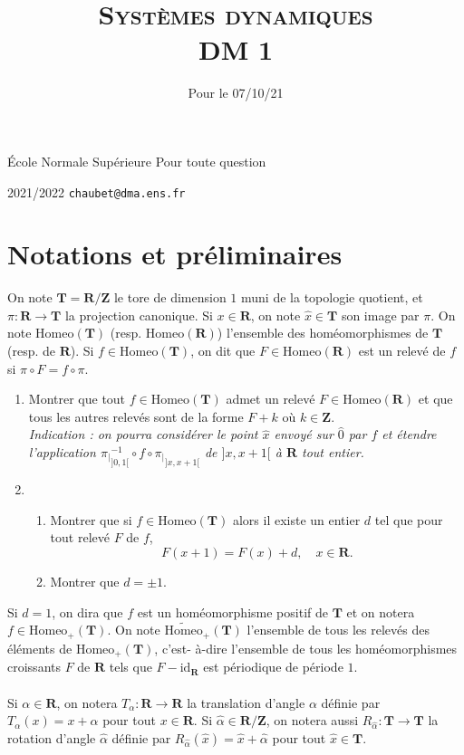 \documentclass[a4paper,12pt]{article}
\title{\textsc{Syst\`emes dynamiques} \\ DM 1}
\date{{Pour le 07/10/21}}
\author{}
\theoremstyle{plain}
\theoremstyle{definition}
\newcommand{\T}{\mathbf{T}}
\newcommand{\R}{\mathbf{R}}
\newcommand{\Z}{\mathbf{Z}}
\newcommand{\Homeo}{\mathrm{Homeo}}
\begin{document}
{\noindent \'Ecole Normale Sup\'erieure \hfill Pour toute question} 
\\
{2021/2022 \hfill \texttt{chaubet@dma.ens.fr}


{\let \newpage \relax \maketitle}
\maketitle

\section*{Notations et pr\'eliminaires}
On note $\T = \R / \Z$ le tore de dimension $1$ muni de la topologie quotient, et $\pi : \R \to \T$ la projection canonique. Si $x \in \R$, on note $\hat{x} \in \T$ son image par $\pi$. On note $\Homeo(\T)$ (resp. $\Homeo(\R)$) l'ensemble des hom\'eomorphismes de $\T$ (resp. de $\R$). Si $f \in \Homeo(\T)$, on dit que $F \in \Homeo(\R)$ est un relev\'e de $f$ si $ \pi \circ F = f \circ \pi.$ 
\\ 
\begin{enumerate}[label=\textbf{\arabic*.}]
\item Montrer que tout $f \in \Homeo(\T)$ admet un relev\'e $F \in \Homeo(\R)$ et que tous les autres relev\'es sont de la forme $F + k$ o\`u $k \in \Z$.\\
\textit{Indication : on pourra consid\'erer le point $\hat x$ envoy\'e sur $\hat{0}$ par $f$ et \'etendre l'application ${\pi_|}_{]0,1[}^{-1} \circ f \circ {\pi_|}_{]x,x+1[}$ de $]x,x+1[$  \`a $\R$ tout entier.}
\item
\begin{enumerate}[label=\textbf{\alph*.}]
\item Montrer que si $f \in \Homeo(\T)$ alors il existe un entier $d$ tel que pour tout relev\'e $F$ de $f$,
$$F(x+1) = F(x) + d, \quad x \in \R.$$ 
\item Montrer que $d = \pm 1$.
\end{enumerate}
\end{enumerate}
Si $d = 1$, on dira que $f$ est un hom\'eomorphisme positif de $\T$ et on notera $f \in \Homeo_+(\T)$. On note $\widetilde{\Homeo}_+(\T)$ l'ensemble de tous les relev\'es des \'el\'ements de $\Homeo_+(\T)$, c'est- \`a-dire l'ensemble de tous les hom\'eomorphismes croissants $F$ de $\R$ tels que $F - \mathrm{id}_{\R}$ est p\'eriodique de p\'eriode $1$. \\ \\
Si $\alpha \in \R$, on notera $T_\alpha : \R \to \R$ la translation d'angle $\alpha$ d\'efinie par $T_\alpha(x) = x+ \alpha$ pour tout $x \in \R$. Si $\hat{\alpha} \in \R / \Z$, on notera aussi $R_{\hat{\alpha}} : \T \to \T$ la rotation d'angle $\hat{\alpha}$ d\'efinie par $R_{\hat{\alpha}}(\hat{x}) = \hat{x}+ \hat{\alpha}$ pour tout $\hat{x} \in \T$.

}
\end{document}
